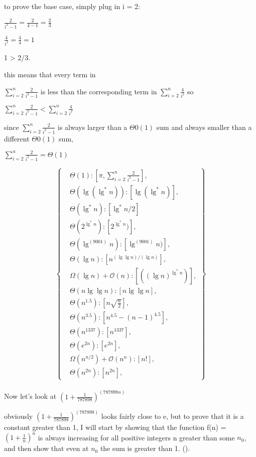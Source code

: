 \documentclass[11pt,fleqn]{article}
\theoremstyle{definition}
\theoremstyle{remark}
\begin{document}
to prove the base case, simply plug in i = 2:

$\frac{2}{i^2 - 1} = \frac{2}{4 - 1} = \frac{2}{3}$

$\frac{4}{i^2} = \frac{4}{4} = 1$

1 > 2/3.

this means that every term in 

$\sum_{i=2}^{n} \frac{2}{i^2 - 1}$ is less than the corresponding term in  $\sum_{i=2}^{n} \frac{4}{i^2}$ so

$\sum_{i=2}^{n} \frac{2}{i^2 - 1} < \sum_{i=2}^{n} \frac{4}{i^2}$

since $\sum_{i=2}^{n} \frac{2}{i^2 - 1}$ is always larger than a $\Theta{0}(1)$ sum
and always smaller than a different $\Theta{0}(1)$ sum,

$\sum_{i=2}^{n} \frac{2}{i^2 - 1} = \Theta(1)$


\[
\left\{
\begin{aligned}
& \Theta(1): [\pi, \sum_{i=2}^{n} \frac{2}{i^2 - 1}],\\
& \Theta(\lg(\lg^*n)): [\lg(\lg^*n)],\\
& \Theta(\lg^* n): [\lg^* n/2]\\
& \Theta(2^{\lg^*n}): [2^{\lg^*n})],\\
& \Theta(\lg^{(9001)} n): [\lg^{(9001)} n)],\\
& \Theta(\lg n): [n^{({\lg \lg n})/({\lg n})}],\\
& \Omega(\lg n) + \mathcal{O}(n): [({(\lg n)}^{\lg^*{n}})],\\
& \Theta(n\lg \lg n): [n\lg \lg n],\\
& \Theta(n^{1.5}): [n\sqrt{\frac{n}{2}}],\\
& \Theta(n^{3.5}): [n^{4.5} - (n - 1)^{4.5}],\\ 
& \Theta(n^{1337}): [n^{1337}],\\
& \Theta(e^{2n}): [e^{2n}],\\
& \Omega(n^{n/2}) + \mathcal{O}(n^n): [n!],\\
& \Theta(n^{2n}): [n^{2n}],
\end{aligned}
\right\}
\]\\

Now let's look at ${(1 + \frac{1}{787898})}^{(787898n)}$

obviously ${(1 + \frac{1}{787898})}^{(787898)}$ looks fairly close
to e, but to prove that it is a constant greater than 1, I will start
by showing that the function f(n) = ${(1 + \frac{1}{n})}^{n}$ is 
always increasing for all positive integers n greater than some $n_0$, 
and then show that even at $n_0$ the sum is greater than 1. 
().\\
\end{document}
